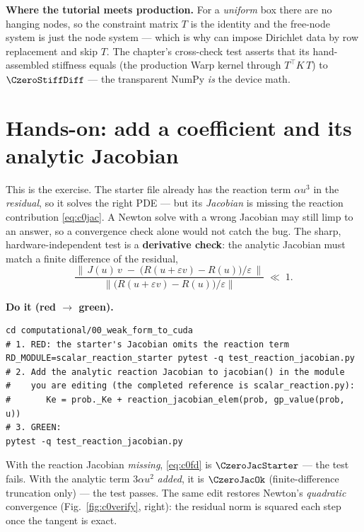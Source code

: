 \begin{keybox}
\textbf{Where the tutorial meets production.} For a \emph{uniform} box
there are no hanging nodes, so the constraint matrix $T$ is the identity
and the free-node system is just the node system --- which is why
 can impose Dirichlet data by row replacement and
skip $T$. The chapter's cross-check test asserts that its hand-assembled
stiffness equals  (the
production Warp kernel through $T^{\!\top}\!K\,T$) to
$\CzeroStiffDiff$ --- the transparent NumPy \emph{is} the device math.
\end{keybox}

\section{Hands-on: add a coefficient and its analytic Jacobian}
\label{sec:c0hands}

This is the exercise. The starter file 
already has the reaction term $\alpha u^3$ in the \emph{residual}, so it
solves the right PDE --- but its \emph{Jacobian} is missing the reaction
contribution \eqref{eq:c0jac}. A Newton solve with a wrong Jacobian may
still limp to an answer, so a convergence check alone would not catch the
bug. The sharp, hardware-independent test is a \textbf{derivative check}:
the analytic Jacobian must match a finite difference of the residual,
%
\begin{equation}
  \frac{\big\|\,J(u)\,v \;-\; \big(R(u+\varepsilon v)-R(u)\big)/\varepsilon\,\big\|}
       {\big\|\big(R(u+\varepsilon v)-R(u)\big)/\varepsilon\big\|}
  \;\ll\; 1 .
  \label{eq:c0fd}
\end{equation}

\begin{runbox}
\textbf{Do it (red $\to$ green).}
\begin{lstlisting}
cd computational/00_weak_form_to_cuda
# 1. RED: the starter's Jacobian omits the reaction term
RD_MODULE=scalar_reaction_starter pytest -q test_reaction_jacobian.py
# 2. Add the analytic reaction Jacobian to jacobian() in the module
#    you are editing (the completed reference is scalar_reaction.py):
#       Ke = prob._Ke + reaction_jacobian_elem(prob, gp_value(prob, u))
# 3. GREEN:
pytest -q test_reaction_jacobian.py
\end{lstlisting}
\end{runbox}

With the reaction Jacobian \emph{missing}, \eqref{eq:c0fd} is
$\CzeroJacStarter$ --- the test fails. With the analytic term
$3\alpha u^2$ \emph{added}, it is $\CzeroJacOk$ (finite-difference
truncation only) --- the test passes. The same edit restores Newton's
\emph{quadratic} convergence (Fig.~\ref{fig:c0verify}, right): the residual
norm is squared each step once the tangent is exact.

